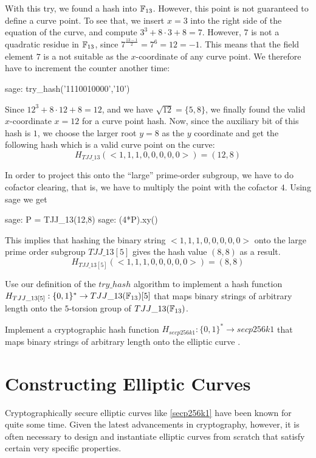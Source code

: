 \begin{example}
With this try, we found a hash into $\mathbb{F}_{13}$. However, this point is not guaranteed to define a curve point. To see that, we insert $x=3$ into the right side of the  equation of the  curve, and compute $3^3 + 8\cdot 3 + 8 = 7$. However, $7$ is not a quadratic residue in $\mathbb{F}_{13}$, since $7^{\frac{13-1}{2}}=7^6=12=-1$. This means that the field element $7$ is a not suitable as the $x$-coordinate of any curve point. We therefore have to increment the counter another time: 
\begin{sagecommandline}
sage: try_hash('1110010000','10')
\end{sagecommandline}
Since $12^3 + 8\cdot 12 + 8 = 12$, and we have $\sqrt{12} = \{5, 8\}$, we finally found the valid $x$-coordinate $x=12$ for a curve point hash. Now, since the auxiliary bit of this hash is $1$, we choose the larger root $y=8$ as the $y$ coordinate and get the following hash which is a valid curve point on the  curve:
$$
H_{TJJ\_13}(<1,1,1,0,0,0,0,0>) = (12,8)
$$

In order to project this onto the ``large'' prime-order subgroup, we have to do cofactor clearing, that is, we have to multiply the point with the cofactor $4$. Using sage we get
\begin{sagecommandline}
sage: P = TJJ_13(12,8)
sage: (4*P).xy()
\end{sagecommandline}

This implies that hashing the binary string $<1,1,1,0,0,0,0,0>$ onto the large prime order subgroup $TJJ\_13[5]$ gives the hash value $(8,8)$ as a result. 
$$
H_{TJJ\_13[5]}(<1,1,1,0,0,0,0,0>) = (8,8)
$$
\end{example}
\begin{exercise}
Use our definition of the $try\_hash$ algorithm to implement a hash function $H_{TJJ\_13[5]} : \{0,1\}^*\to TJJ\_13(\mathbb{F}_{13})[5]$ that maps binary strings of arbitrary length onto the $5$-torsion group of $TJJ\_13(\mathbb{F}_{13})$. 
\end{exercise}
\begin{exercise}
Implement a cryptographic hash function $H_{secp256k1} : \{0,1\}^*\to secp256k1$ that maps binary strings of arbitrary length onto the elliptic curve . 
\end{exercise}
\section{Constructing Elliptic Curves} Cryptographically secure elliptic curves like  \ref{secp256k1} have been known for quite some time. Given the latest advancements in cryptography, however, it is often necessary to design and instantiate elliptic curves from scratch that satisfy certain very specific properties. 

